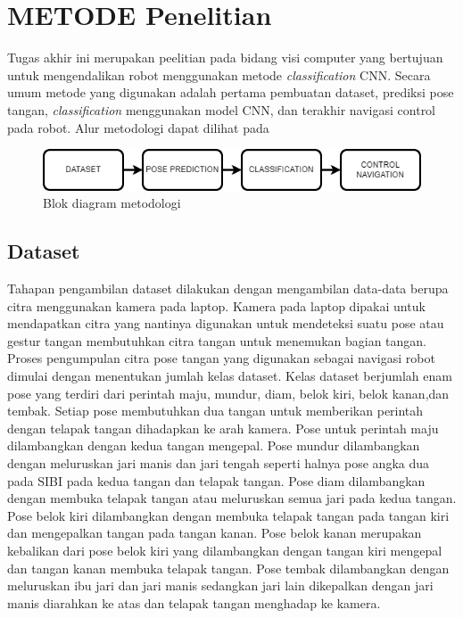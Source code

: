 \chapter{METODE Penelitian}
\label{chap:desainimplementasi}


Tugas akhir ini merupakan peelitian pada bidang visi computer yang bertujuan untuk mengendalikan robot menggunakan metode \emph{classification} CNN. Secara umum metode yang digunakan adalah pertama pembuatan dataset, prediksi pose tangan, \emph{classification} menggunakan model CNN, dan terakhir navigasi control pada robot. Alur metodologi dapat dilihat pada

\begin{figure}[!h]
  \centering
	\includegraphics[width=1\linewidth]{gambar/metodologi.png}
	\caption{Blok diagram metodologi}
	\label{fig:metodologi}
\end{figure}

\section{Dataset}
\label{sec:deskripsisistem}

Tahapan pengambilan dataset dilakukan dengan mengambilan data-data berupa citra menggunakan kamera pada laptop. Kamera pada laptop dipakai untuk mendapatkan citra yang nantinya digunakan untuk mendeteksi suatu pose atau gestur tangan membutuhkan citra tangan untuk menemukan bagian tangan. Proses pengumpulan citra pose tangan yang digunakan sebagai navigasi robot  dimulai dengan menentukan jumlah kelas dataset. Kelas dataset berjumlah enam pose yang terdiri dari perintah maju, mundur, diam, belok kiri, belok kanan,dan tembak. Setiap pose membutuhkan dua tangan untuk memberikan perintah dengan telapak tangan dihadapkan ke arah kamera. Pose untuk perintah maju dilambangkan dengan kedua tangan mengepal. Pose mundur dilambangkan dengan meluruskan jari manis dan jari tengah seperti halnya pose angka dua pada SIBI pada kedua tangan dan telapak tangan.  Pose diam dilambangkan dengan membuka telapak tangan atau meluruskan semua jari pada kedua tangan.  Pose belok kiri dilambangkan dengan membuka telapak tangan pada tangan kiri dan mengepalkan tangan pada tangan kanan. Pose belok kanan merupakan kebalikan dari pose belok kiri yang dilambangkan dengan tangan kiri mengepal dan tangan kanan membuka telapak tangan. Pose tembak dilambangkan dengan meluruskan ibu jari dan jari manis sedangkan jari lain dikepalkan dengan jari manis diarahkan ke atas dan telapak tangan menghadap ke kamera.

